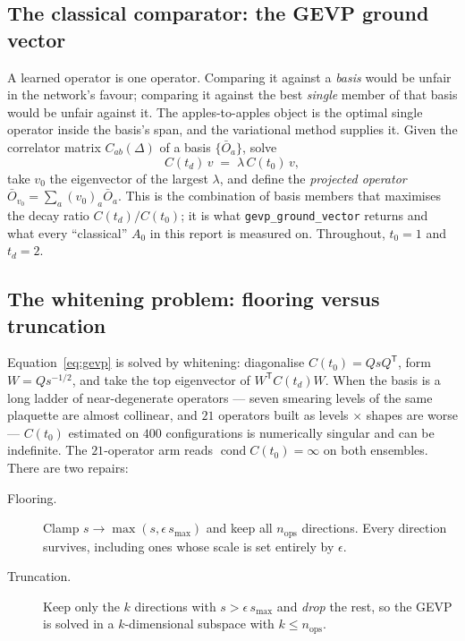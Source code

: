 \documentclass[11pt,a4paper]{article}
\newcommand{\Obar}{\bar{O}}
\newcommand{\Azero}{A_0}
\begin{document}
\subsection{The classical comparator: the GEVP ground vector}
\label{sec:gevp}

A learned operator is one operator. Comparing it against a \emph{basis} would be
unfair in the network's favour; comparing it against the best \emph{single}
member of that basis would be unfair against it. The apples-to-apples object is
the optimal single operator inside the basis's span, and the variational method
supplies it. Given the correlator matrix $C_{ab}(\Delta)$ of a basis
$\{\Obar_a\}$, solve
\begin{equation}
  C(t_d)\, v \;=\; \lambda\, C(t_0)\, v ,
  \label{eq:gevp}
\end{equation}
take $v_0$ the eigenvector of the largest $\lambda$, and define the
\emph{projected operator} $\Obar_{v_0} = \sum_a (v_0)_a \Obar_a$. This is the
combination of basis members that maximises the decay ratio $C(t_d)/C(t_0)$; it
is what \texttt{gevp\_ground\_vector} returns and what every ``classical''
$\Azero$ in this report is measured on. Throughout, $t_0 = 1$ and $t_d = 2$.

\subsection{The whitening problem: flooring versus truncation}
\label{sec:whitening}

Equation~\eqref{eq:gevp} is solved by whitening: diagonalise $C(t_0) = Q s
Q^{\mathsf T}$, form $W = Q s^{-1/2}$, and take the top eigenvector of
$W^{\mathsf T} C(t_d) W$. When the basis is a long ladder of near-degenerate
operators --- seven smearing levels of the same plaquette are almost collinear,
and $21$ operators built as levels $\times$ shapes are worse --- $C(t_0)$
estimated on $400$ configurations is numerically singular and can be indefinite.
The $21$-operator arm reads $\operatorname{cond} C(t_0) = \infty$ on both
ensembles. There are two repairs:

\begin{description}
  \item[Flooring.] Clamp $s \to \max(s, \epsilon\, s_{\max})$ and keep all
        $n_{\text{ops}}$ directions. Every direction survives, including ones
        whose scale is set entirely by $\epsilon$.
  \item[Truncation.] Keep only the $k$ directions with $s > \epsilon\, s_{\max}$
        and \emph{drop} the rest, so the GEVP is solved in a $k$-dimensional
        subspace with $k \le n_{\text{ops}}$.
\end{description}
\end{document}
